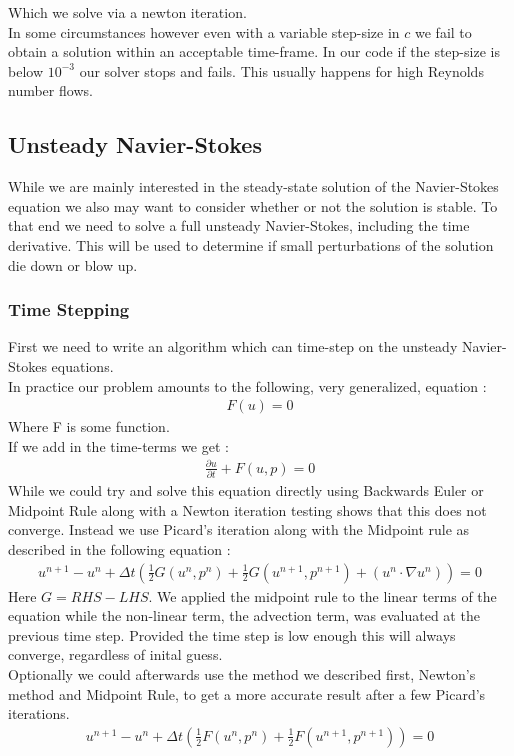 \documentclass[11pt,twoside,a4paper]{article}
\begin{document}
Which we solve via a newton iteration.\\
In some circumstances however even with a variable step-size in $c$ we fail to obtain a solution within an acceptable time-frame. In our code if the step-size is below $10^{-3}$ our solver stops and fails. This usually happens for high Reynolds number flows.

\subsection{Unsteady Navier-Stokes}

While we are mainly interested in the steady-state solution of the Navier-Stokes equation we also may want to consider whether or not the solution is stable. To that end we need to solve a full unsteady Navier-Stokes, including the time derivative. This will be used to determine if small perturbations of the solution die down or blow up.

\subsubsection{Time Stepping}
First we need to write an algorithm which can time-step on the unsteady Navier-Stokes equations.\\
In practice our problem amounts to the following, very generalized, equation :
\begin{align}
F(u) = 0
\end{align}
Where F is some function.\\
If we add in the time-terms we get :
\begin{align}
\frac{\partial u}{\partial t} + F(u,p) = 0
\end{align}
While we could try and solve this equation directly using Backwards Euler or Midpoint Rule along with a Newton iteration testing shows that this does not converge. Instead we use Picard's iteration along with the Midpoint rule as described in the following equation :
\begin{align}
u^{n+1} - u^n + \Delta t (\frac{1}{2}G(u^n,p^n) + \frac{1}{2} G(u^{n+1},p^{n+1}) + ( u^n \cdot \nabla u^n) ) = 0
\end{align}
Here $G = RHS - LHS $. We applied the midpoint rule to the linear terms of the equation while the non-linear term, the advection term, was evaluated at the previous time step. Provided the time step is low enough this will always converge, regardless of inital guess.\\
Optionally we could afterwards use the method we described first, Newton's method and Midpoint Rule, to get a more accurate result after a few Picard's iterations.
\begin{align}
u^{n+1} - u^n + \Delta t (\frac{1}{2}F(u^n,p^n) + \frac{1}{2} F(u^{n+1},p^{n+1})) = 0
\end{align}
\end{document}
